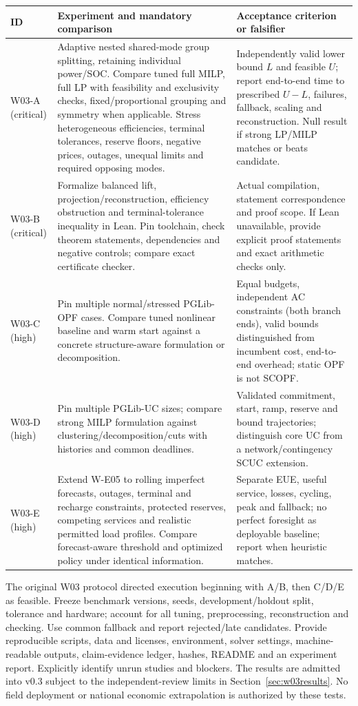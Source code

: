 \documentclass[11pt,letterpaper]{article}
\begin{document}
\begin{longtable}{P{.16\linewidth}P{.39\linewidth}P{.35\linewidth}}
\toprule ID & Experiment and mandatory comparison & Acceptance criterion or falsifier\\\midrule\endhead
W03-A (critical) & Adaptive nested shared-mode group splitting, retaining individual power/SOC. Compare tuned full MILP, full LP with feasibility and exclusivity checks, fixed/proportional grouping and symmetry when applicable. Stress heterogeneous efficiencies, terminal tolerances, reserve floors, negative prices, outages, unequal limits and required opposing modes. & Independently valid lower bound $L$ and feasible $U$; report end-to-end time to prescribed $U-L$, failures, fallback, scaling and reconstruction. Null result if strong LP/MILP matches or beats candidate.\\
W03-B (critical) & Formalize balanced lift, projection/reconstruction, efficiency obstruction and terminal-tolerance inequality in Lean. Pin toolchain, check theorem statements, dependencies and negative controls; compare exact certificate checker. & Actual compilation, statement correspondence and proof scope. If Lean unavailable, provide explicit proof statements and exact arithmetic checks only.\\
W03-C (high) & Pin multiple normal/stressed PGLib-OPF cases. Compare tuned nonlinear baseline and warm start against a concrete structure-aware formulation or decomposition. & Equal budgets, independent AC constraints (both branch ends), valid bounds distinguished from incumbent cost, end-to-end overhead; static OPF is not SCOPF.\\
W03-D (high) & Pin multiple PGLib-UC sizes; compare strong MILP formulation against clustering/decomposition/cuts with histories and common deadlines. & Validated commitment, start, ramp, reserve and bound trajectories; distinguish core UC from a network/contingency SCUC extension.\\
W03-E (high) & Extend W-E05 to rolling imperfect forecasts, outages, terminal and recharge constraints, protected reserves, competing services and realistic permitted load profiles. Compare forecast-aware threshold and optimized policy under identical information. & Separate EUE, useful service, losses, cycling, peak and fallback; no perfect foresight as deployable baseline; report when heuristic matches.\\
\bottomrule
\end{longtable}

The original W03 protocol directed execution beginning with A/B, then C/D/E as feasible. Freeze benchmark versions, seeds, development/holdout split, tolerance and hardware; account for all tuning, preprocessing, reconstruction and checking. Use common fallback and report rejected/late candidates. Provide reproducible scripts, data and licenses, environment, solver settings, machine-readable outputs, claim-evidence ledger, hashes, README and an experiment report. Explicitly identify unrun studies and blockers. The results are admitted into v0.3 subject to the independent-review limits in Section~\ref{sec:w03results}. No field deployment or national economic extrapolation is authorized by these tests.
\end{document}
